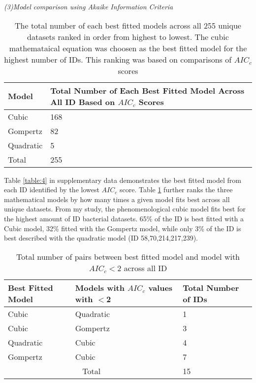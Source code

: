 \documentclass[11pt]{article}
\begin{document}
\noindent\emph{(3)Model comparison using Akaike Information Criteria}

    \begin{table}[htb]
        \caption{The total number of each best fitted models across all 255 unique datasets ranked in order from highest to lowest. The cubic mathemataical equation was
        choosen as the best fitted model for the highest number of IDs. This ranking was based on comparisons of $AIC_{c}$ scores}
        \centering
        \footnotesize 
        \begin{tabular}{  m{3cm}  m{12em}  }
            \toprule\toprule
            Model & Total Number of Each Best Fitted Model Across All ID Based on $AIC_{c}$ Scores \\
            \midrule
            Cubic & 168 \\ 
            Gompertz & 82 \\
            Quadratic & 5 \\
            Total & 255 \\
            \bottomrule
        \end{tabular}
    \label{table:1}
    \end{table}  

Table \ref{table:4} in supplementary data demonstrates the best fitted model from each ID identified by the lowest $AIC_{c}$ score. Table \ref{table:1} further ranks
the three mathematical models by how many times a given model fits best across all unique datasets. From my study, the phenomenological cubic 
model fits best for the highest amount of ID bacterial datasets. 65\% of the ID is best fitted with a Cubic model, 32\% fitted with the 
Gompertz model, while only 3\% of the ID is best described with the quadratic model (ID 58,70,214,217,239). 

    \begin{table}[htb]
        \caption{Total number of pairs between best fitted model and model with $AIC_{c}<$2 across all ID}
        \centering
        \footnotesize
        \begin{tabular}{  m{6em}  m{8em} m{8em} }
            \toprule\toprule
            Best Fitted Model & Models with $AIC_{c}$ values with $<$2 & Total Number of IDs \\
            \midrule
            Cubic & Quadratic & 1 \\ 
            Cubic & Gompertz & 3 \\
            Quadratic & Cubic & 4 \\
            Gompertz & Cubic & 7 \\
            \multicolumn{2}{c}{Total} & 15 \\
            \bottomrule
        \end{tabular}
    \label{table:2}
    \end{table}  
\end{document}

